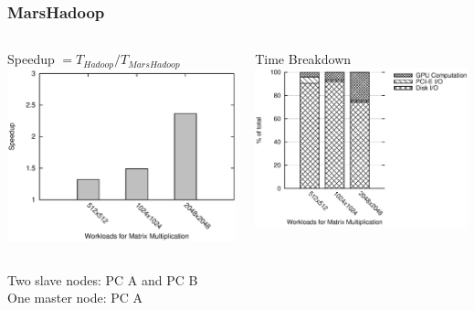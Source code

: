 \begin{frame}
\frametitle{MarsHadoop}
\begin{columns}
\begin{block}{Speedup $= T_{Hadoop}/T_{MarsHadoop}$}
\includegraphics[width=1.00\linewidth]{figure/speeduphadoop.eps}
\end{block}
\begin{block}{Time Breakdown}
\includegraphics[width=1.0\linewidth]{figure/breakdownhadoop.eps}
\end{block}
\end{columns}
Two slave nodes: PC A and PC B\\
One master node: PC A
\end{frame}
